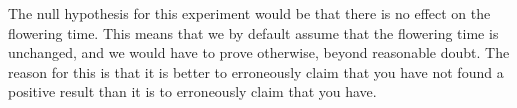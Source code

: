 The null hypothesis for this experiment would be that there is no effect on the flowering time. This means that we by default assume that the flowering time is unchanged, and we would have to prove otherwise, beyond reasonable doubt. The reason for this is that it is better to erroneously claim that you have not found a positive result than it is to erroneously claim that you have.